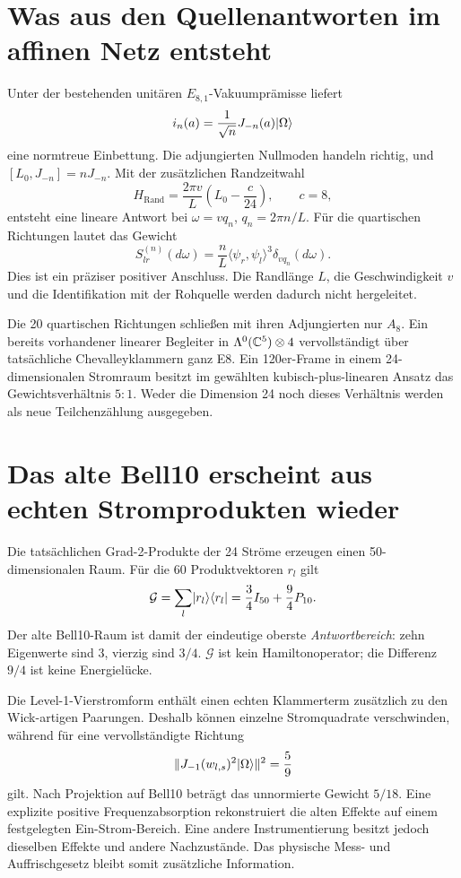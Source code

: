 \section{Was aus den Quellenantworten im affinen Netz entsteht}
Unter der bestehenden unitären $E_{8,1}$-Vakuumprämisse liefert
\[
 i_n(a)=\frac1{\sqrt n}J_{-n}(a)\lvert \Omega\rangle
\]
eine normtreue Einbettung. Die adjungierten Nullmoden handeln richtig, und $[L_0,J_{-n}]=nJ_{-n}$. Mit der zusätzlichen Randzeitwahl
\[
 H_{\mathrm{Rand}}=\frac{2\pi v}{L}\left(L_0-\frac c{24}\right),
 \qquad c=8,
\]
entsteht eine lineare Antwort bei $\omega=vq_n$, $q_n=2\pi n/L$. Für die quartischen Richtungen lautet das Gewicht
\[
 S_{lr}^{(n)}(d\omega)=\frac nL
 \langle\psi_r,\psi_l\rangle^3\delta_{vq_n}(d\omega).
\]
Dies ist ein präziser positiver Anschluss. Die Randlänge $L$, die Geschwindigkeit $v$ und die Identifikation mit der Rohquelle werden dadurch nicht hergeleitet. 

Die 20 quartischen Richtungen schließen mit ihren Adjungierten nur $A_8$. Ein bereits vorhandener linearer Begleiter in $\Lambda^0(\mathbb C^5)\otimes4$ vervollständigt über tatsächliche Chevalleyklammern ganz E8. Ein 120er-Frame in einem 24-dimensionalen Stromraum besitzt im gewählten kubisch-plus-linearen Ansatz das Gewichtsverhältnis $5:1$. Weder die Dimension 24 noch dieses Verhältnis werden als neue Teilchenzählung ausgegeben. 

\section{Das alte Bell10 erscheint aus echten Stromprodukten wieder}
Die tatsächlichen Grad-2-Produkte der 24 Ströme erzeugen einen 50-dimensionalen Raum. Für die 60 Produktvektoren $r_l$ gilt
\[
 \mathcal G=\sum_l\lvert r_l\rangle\langle r_l\rvert
 =\frac34I_{50}+\frac94P_{10}.
\]
Der alte Bell10-Raum ist damit der eindeutige oberste \emph{Antwortbereich}: zehn Eigenwerte sind $3$, vierzig sind $3/4$. $\mathcal G$ ist kein Hamiltonoperator; die Differenz $9/4$ ist keine Energielücke. 

Die Level-1-Vierstromform enthält einen echten Klammerterm zusätzlich zu den Wick-artigen Paarungen. Deshalb können einzelne Stromquadrate verschwinden, während für eine vervollständigte Richtung
\[
 \|J_{-1}(w_{l,s})^2\lvert \Omega\rangle\|^2=\frac59
\]
gilt. Nach Projektion auf Bell10 beträgt das unnormierte Gewicht $5/18$. Eine explizite positive Frequenzabsorption rekonstruiert die alten Effekte auf einem festgelegten Ein-Strom-Bereich. Eine andere Instrumentierung besitzt jedoch dieselben Effekte und andere Nachzustände. Das physische Mess- und Auffrischgesetz bleibt somit zusätzliche Information. 

